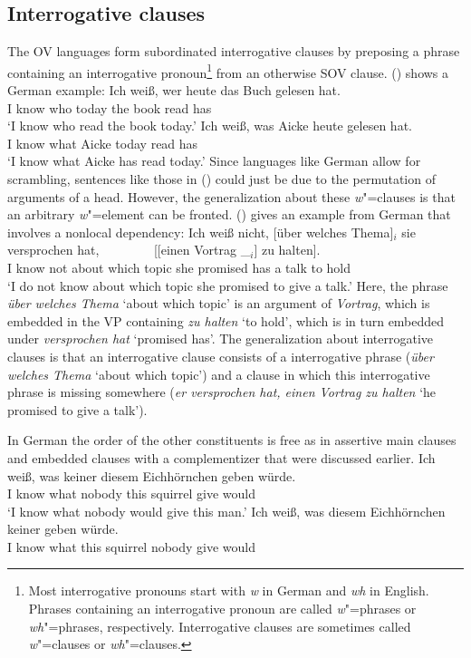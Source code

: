 \subsection{Interrogative clauses}


The OV languages form subordinated interrogative clauses by preposing a phrase containing an
interrogative pronoun\footnote{
Most interrogative pronouns start with \emph{w} in German and \emph{wh} in English. Phrases
containing an interrogative pronoun are called \emph{w}"=phrases or \emph{wh}"=phrases,
respectively. Interrogative clauses are sometimes called \emph{w}"=clauses or \emph{wh}"=clauses.
} from an
otherwise SOV clause. () shows a German example:
\eal
\ex 
\gll Ich weiß, wer heute das Buch gelesen hat.\\
     I know    who today the book read has\\
\glt `I know who read the book today.'
\ex 
\gll Ich weiß, was Aicke heute gelesen hat.\\
     I know    what Aicke today read has\\
\glt `I know what Aicke has read today.'
\zl
Since languages like German allow for scrambling, sentences like those in () could just be due
to the permutation of arguments of a head. However, the generalization about these \emph{w}"=clauses
is that an arbitrary \emph{w}"=element can be fronted. () gives an example from German that
involves a nonlocal dependency:
\ea
\gll Ich weiß nicht, [über welches Thema]$_i$ sie versprochen hat,~~~~~~~~ [[einen Vortrag \_$_i$] zu halten].\\
     I know not      \spacebr about which topic she promised has \hphantom{[[}a talk to  hold\\
\glt `I do not know about which topic she promised to give a talk.'
\z
Here, the phrase \emph{über welches Thema} `about which topic' is an argument of \emph{Vortrag},
which is embedded in the VP containing \emph{zu halten} `to hold', which is in turn embedded under
\emph{versprochen hat} `promised has'. The generalization about interrogative clauses is that an
interrogative clause consists of a interrogative phrase (\emph{über welches Thema} `about which
topic') and a clause in which this interrogative phrase is missing somewhere (\emph{er versprochen
  hat, einen Vortrag zu halten} `he promised to give a talk').

In German the order of the other constituents is free as in assertive main clauses and embedded
clauses with a complementizer that were discussed earlier. 
\eal
\ex
\gll Ich weiß, was keiner diesem Eichhörnchen geben würde.\\
     I know    what nobody this squirrel give would\\
\glt `I know what nobody would give this man.'
\ex 
\gll Ich weiß, was diesem Eichhörnchen keiner geben würde.\\
     I know what this squirrel nobody give would\\
\zl

